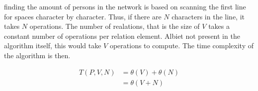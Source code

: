 finding the amount of persons in the network is based on 
scanning the first line for spaces character by character.
Thus, if there are $N$ characters in the line, it takes $N$
operations. The number of realations, that is the size of $V$
takes a constant number of operations per relation element. 
Albiet not present in the algorithm itself, this would take
$V$ operations to compute. The time complexity of the algorithm
is then.

\begin{align*}
T(P, V, N) &= \theta \left( V \right) + \theta \left( N \right)\\
           &= \theta \left( V + N \right)
\end{align*}




